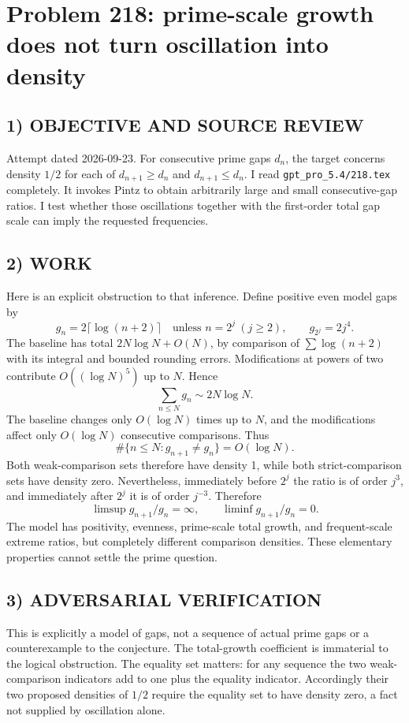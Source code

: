 \section{Problem 218: prime-scale growth does not turn oscillation into density}
\subsection*{1) OBJECTIVE AND SOURCE REVIEW}
Attempt dated 2026-09-23. For consecutive prime gaps $d_n$, the target concerns density $1/2$ for each of $d_{n+1}\ge d_n$ and $d_{n+1}\le d_n$. I read \texttt{gpt\_pro\_5.4/218.tex} completely. It invokes Pintz to obtain arbitrarily large and small consecutive-gap ratios. I test whether those oscillations together with the first-order total gap scale can imply the requested frequencies.
\subsection*{2) WORK}
Here is an explicit obstruction to that inference. Define positive even model gaps by
\[
g_n=2\lceil\log(n+2)\rceil\quad\text{unless }n=2^j\ (j\ge2),
\qquad g_{2^j}=2j^4.
\]
The baseline has total $2N\log N+O(N)$, by comparison of $\sum\log(n+2)$ with its integral and bounded rounding errors. Modifications at powers of two contribute $O((\log N)^5)$ up to $N$. Hence
\[
\sum_{n\le N}g_n\sim2N\log N.
\]
The baseline changes only $O(\log N)$ times up to $N$, and the modifications affect only $O(\log N)$ consecutive comparisons. Thus
\[
\#\{n\le N:g_{n+1}\ne g_n\}=O(\log N).
\]
Both weak-comparison sets therefore have density 1, while both strict-comparison sets have density zero. Nevertheless, immediately before $2^j$ the ratio is of order $j^3$, and immediately after $2^j$ it is of order $j^{-3}$. Therefore
\[
\limsup g_{n+1}/g_n=\infty,\qquad\liminf g_{n+1}/g_n=0.
\]
The model has positivity, evenness, prime-scale total growth, and frequent-scale extreme ratios, but completely different comparison densities. These elementary properties cannot settle the prime question.
\subsection*{3) ADVERSARIAL VERIFICATION}
This is explicitly a model of gaps, not a sequence of actual prime gaps or a counterexample to the conjecture. The total-growth coefficient is immaterial to the logical obstruction. The equality set matters: for any sequence the two weak-comparison indicators add to one plus the equality indicator. Accordingly their two proposed densities of $1/2$ require the equality set to have density zero, a fact not supplied by oscillation alone.
